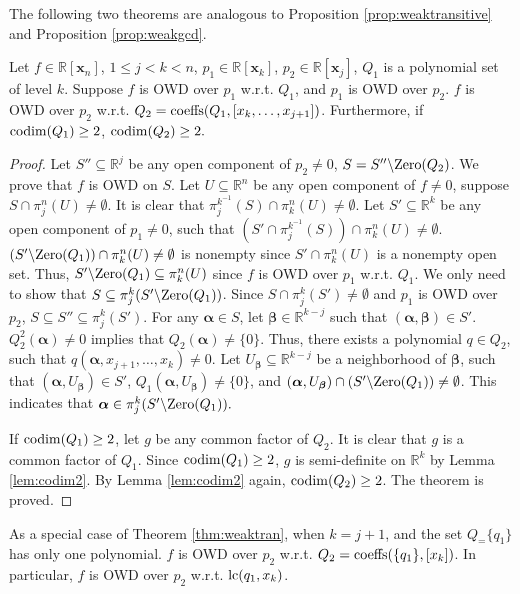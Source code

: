 \documentclass[amsthm]{elsart}
\def \coeffs{{\rm coeffs}}
\def \codim {{\rm codim}}
\def \lc  {{\rm lc}}
\def  \zero {{\rm Zero}}
\def \RR {{\mathbb R}}
\newcommand{\xx}{\bm{x}}
\begin{document}
The following two theorems are analogous to Proposition \ref{prop:weaktransitive} and Proposition \ref{prop:weakgcd}. \begin{thm}\label{thm:weaktran}
  Let $f\in\RR[\xx_n]$, $1\le j<k<n$, $p_1\in\RR[\xx_k]$, $p_2\in\RR[\xx_j]$, $Q_1$ is a polynomial set of level $k$. Suppose $f$ is OWD over $p_1$ w.r.t. $Q_1$, and $p_1$ is OWD over $p_2$. $f$ is OWD over $p_2$ w.r.t. $Q_2=\coeffs(Q_1,[x_{k},\ldots,x_{j+1}])$. Furthermore, if $\codim(Q_1)\ge2$, $\codim(Q_2)\ge2.$  \end{thm}
\begin{proof}
  Let $S''\subseteq\RR^j$ be any open component of $p_2\neq0$, $S=S''\backslash \zero(Q_2)$. We prove that $f$ is OWD on $S$. Let $U\subseteq\RR^n$ be any open component of $f\neq0$, suppose $S\cap \pi_{j}^n(U)\neq\emptyset$. It is clear that $\pi_j^{k^{-1}}(S)\cap\pi_{k}^n(U)\neq\emptyset$. Let $S'\subseteq\RR^k$ be any open component of $p_1\neq0$, such that $(S'\cap\pi_j^{k^{-1}}(S))\cap\pi_{k}^n(U)\neq\emptyset$. $(S'\backslash\zero(Q_1))\cap\pi_{k}^n(U)\neq\emptyset$ is nonempty since $S'\cap\pi_{k}^n(U)$ is a nonempty open set. Thus, $S'\backslash\zero(Q_1)\subseteq\pi_{k}^n(U)$ since $f$ is OWD over $p_1$ w.r.t. $Q_1$. We only need to show that $S\subseteq \pi_{j}^{k}(S'\backslash\zero(Q_1))$. Since $S\cap\pi_{j}^{k}(S')\neq\emptyset$ and $p_1$ is OWD over $p_2$, $S\subseteq S''\subseteq\pi_{j}^{k}(S')$. For any $\bm{\alpha}\in S$, let $\bm{\beta}\in \RR^{k-j}$ such that $(\bm{\alpha},\bm{\beta})\in S'$. $Q_2^2(\bm{\alpha})\neq0$ implies that $Q_2(\bm{\alpha})\neq\{0\}$. Thus, there exists a polynomial $q\in Q_2$, such that $q(\bm{\alpha},x_{j+1},\ldots,x_k)\neq0$. Let $U_{\bm{\beta}}\subseteq\RR^{k-j}$ be a neighborhood of $\bm{\beta}$, such that $(\bm{\alpha},U_{\bm{\beta}})\in S'$, $Q_1(\bm{\alpha},U_{\bm{\beta}})\neq\{0\}$, and
   $(\bm{\alpha},U_{\bm{\beta}})\cap (S'\backslash\zero(Q_1))\neq\emptyset$. This indicates that $\bm{\alpha}\in\pi_{j}^{k}(S'\backslash\zero(Q_1)).$

 If $\codim(Q_1)\ge2$, let $g$ be any common factor of $Q_2$. It is clear that $g$ is a common factor of $Q_1$. Since $\codim(Q_1)\ge2$, $g$ is semi-definite on $\RR^k$ by Lemma \ref{lem:codim2}. By Lemma \ref{lem:codim2} again, $\codim(Q_2)\ge2$.
The theorem is proved.
\end{proof}
As a special case of Theorem \ref{thm:weaktran}, when $k=j+1$, and the set $Q_=\{q_1\}$ has only one polynomial. $f$ is OWD over $p_2$ w.r.t. $Q_2=\coeffs(\{q_1\},[x_{k}])$. In particular, $f$ is OWD over $p_2$ w.r.t. $\lc(q_1,x_{k})$.
\end{document}
